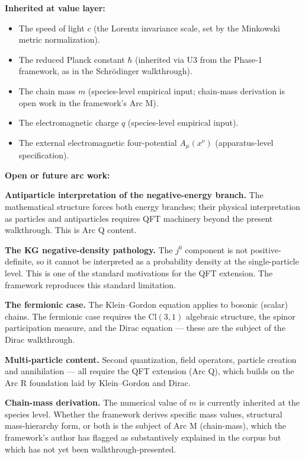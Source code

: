 \documentclass[11pt,a4paper]{article}
\begin{document}
\textbf{Inherited at value layer:}

\begin{itemize}[noitemsep]
  \item The speed of light $c$ (the Lorentz invariance scale, set by the Minkowski metric normalization).
  \item The reduced Planck constant $\hbar$ (inherited via U3 from the Phase-1 framework, as in the Schr\"odinger walkthrough).
  \item The chain mass $m$ (species-level empirical input; chain-mass derivation is open work in the framework's Arc M).
  \item The electromagnetic charge $q$ (species-level empirical input).
  \item The external electromagnetic four-potential $A_\mu(x^\nu)$ (apparatus-level specification).
\end{itemize}

\textbf{Open or future arc work:}

\textbf{Antiparticle interpretation of the negative-energy branch.} The mathematical structure forces both energy branches; their physical interpretation as particles and antiparticles requires QFT machinery beyond the present walkthrough. This is Arc Q content.

\textbf{The KG negative-density pathology.} The $j^0$ component is not positive-definite, so it cannot be interpreted as a probability density at the single-particle level. This is one of the standard motivations for the QFT extension. The framework reproduces this standard limitation.

\textbf{The fermionic case.} The Klein--Gordon equation applies to bosonic (scalar) chains. The fermionic case requires the $\mathrm{Cl}(3,1)$ algebraic structure, the spinor participation measure, and the Dirac equation --- these are the subject of the Dirac walkthrough.

\textbf{Multi-particle content.} Second quantization, field operators, particle creation and annihilation --- all require the QFT extension (Arc Q), which builds on the Arc R foundation laid by Klein--Gordon and Dirac.

\textbf{Chain-mass derivation.} The numerical value of $m$ is currently inherited at the species level. Whether the framework derives specific mass values, structural mass-hierarchy form, or both is the subject of Arc M (chain-mass), which the framework's author has flagged as substantively explained in the corpus but which has not yet been walkthrough-presented.
\end{document}
